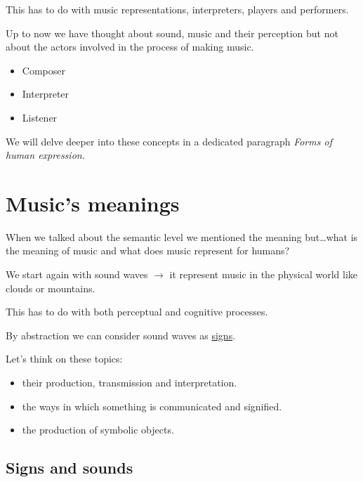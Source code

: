 This has to do with music representations, interpreters, players and performers.

Up to now we have thought about sound, music and their perception but not about the actors involved in the process of making music.

\begin{itemize}
\tightlist
\item Composer
\item Interpreter
\item Listener
\end{itemize}

We will delve deeper into these concepts in a dedicated paragraph \textit{Forms of human expression}.

\section{Music's meanings }\label{musics-meanings}

When we talked about the semantic level we mentioned the meaning but\ldots what is the meaning of music and what does music represent for humans?

We start again with sound waves \(\rightarrow\) it represent music in the physical world like clouds or mountains.

This has to do with both perceptual and cognitive processes.

By abstraction we can consider sound waves as \href{segno1.mp4}{signs}.

Let's think on these topics: 

\begin{itemize}
\tightlist
\item their production, transmission and interpretation. 
\item the ways in which something is communicated and signified. 
\item the production of symbolic objects.
\end{itemize}

\subsection{Signs and sounds }\label{signs-and-sounds}

